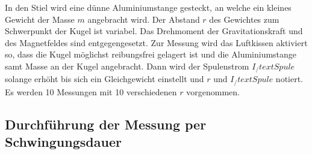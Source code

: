 In den Stiel wird eine dünne Aluminiumstange
gesteckt, an welche ein kleines Gewicht der Masse $m$ angebracht wird.
Der Abstand $r$ des Gewichtes zum Schwerpunkt der Kugel ist variabel.
Das Drehmoment der Gravitationskraft und des Magnetfeldes sind entgegengesetzt.
Zur Messung wird das Luftkissen aktiviert so, dass die Kugel möglichst
reibungsfrei gelagert ist und die Aluminiumstange samt Masse an der Kugel angebracht.
Dann wird der Spulenstrom $I_/text{Spule}$ solange erhöht bis sich ein Gleichgewicht einstellt und
$r$ und $I_/text{Spule}$ notiert. Es werden 10 Messungen mit 10 verschiedenen $r$ vorgenommen.


\subsection{Durchführung der Messung per Schwingungsdauer}
\label{ssec:DurchSchw}
